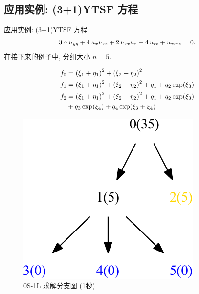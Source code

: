 \subsection{应用实例: (3+1)YTSF 方程}
\begin{frame}{应用实例: (3+1)YTSF 方程}
\[
    3\,\alpha\,u_{{{\it yy}}}+4\,u_{{x}}u_{{{\it xz}}}+2\,u_{{{\it xx}}}u_{{z}}-4\,u_{{{\it tx}}}+u_{{{\it xxxz}}}=0. 
\]
在接下来的例子中, 分组大小 $n=5$. 

\[
\begin{aligned}
    f_0 &=\left(\xi_1+\eta_1\right)^2+\left(\xi_2+\eta_2\right)^2 \\ 
    f_1 &= \left(\xi_1+\eta_1\right)^2+\left(\xi_2+\eta_2\right)^2+q_1+q_2 \exp(\xi_3) \\ 
    f_2 &= \left(\xi_1+\eta_1\right)^2+\left(\xi_2+\eta_2\right)^2+q_1+q_2 \exp(\xi_3) \\
        & +q_3 \exp(\xi_4) + q_4 \exp(\xi_3+\xi_4)
\end{aligned}
\]
\end{frame}
\begin{frame}
\begin{figure}
\centering
\includegraphics[width=.5\textwidth]{../paper/fig/0S1L.pdf}
\caption{0S-1L 求解分支图 (1秒)}
\end{figure}
\end{frame}


